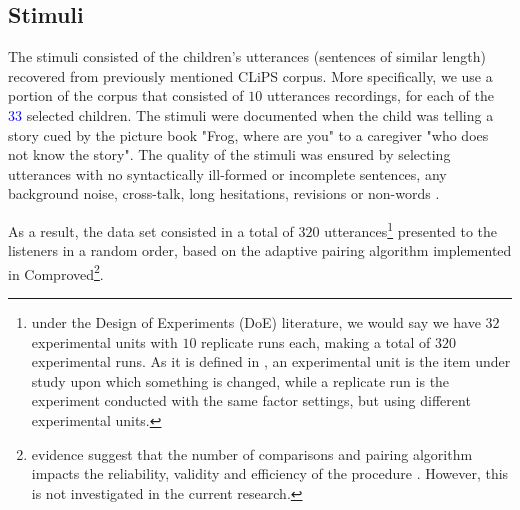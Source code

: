 \begin{comment}
\textbf{for the experimenter:} Based on \citet{Faes_et_al_2021} we depict the procedure for the experimenter:
%
\begin{enumerate}
	\item 1. matching procedure 
	\item selection of suitable stimuli
	\item determine the number of stimuli per judge 
	\item 
\end{enumerate}	
\end{comment}
%
%
\subsection{Stimuli} \label{s_sect:stimuli}
%
The stimuli consisted of the children's utterances (sentences of similar length) recovered from previously mentioned CLiPS corpus. More specifically, we use a portion of the corpus that consisted of $10$ utterances recordings, for each of the \textcolor{blue}{$33$} selected children. The stimuli were documented when the child was telling a story cued by the picture book "Frog, where are you" \citep{Mayer_1969} to a caregiver "who does not know the story". The quality of the stimuli was ensured by selecting utterances with no syntactically ill-formed or incomplete sentences, any background noise, cross-talk, long hesitations, revisions or non-words \citep{Boonen_et_al_2021}. 

As a result, the data set consisted in a total of $320$ utterances\footnote{under the Design of Experiments (DoE) literature, we would say we have $32$ experimental units with $10$ replicate runs each, making a total of $320$ experimental runs. As it is defined in \citet{Lawson_2015}, an experimental unit is the item under study upon which something is changed, while a replicate run is the experiment conducted with the same factor settings, but using different experimental units.} presented to the listeners in a random order, based on the adaptive pairing algorithm \citep{Pollitt_2012b} implemented in Comproved\footnote{evidence suggest that the number of comparisons and pairing algorithm impacts the reliability, validity and efficiency of the procedure \citep{Bramley_2015, Bramley_et_al_2018, Lesterhuis_2018, Verhavert_et_al_2019}. However, this is not investigated in the current research.}.

